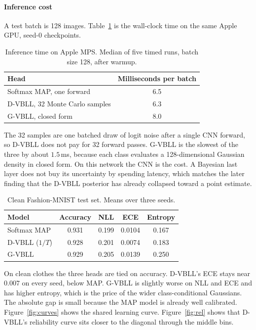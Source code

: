 \documentclass[11pt,a4paper]{article}
\begin{document}
\paragraph{Inference cost}
A test batch is 128 images.
Table~\ref{tab:latency} is the wall-clock time on the same Apple GPU, seed-0 checkpoints.

\begin{table}[H]
\centering
\caption{Inference time on Apple MPS. Median of five timed runs, batch size 128, after warmup.}
\label{tab:latency}
\begin{tabular}{lc}
\toprule
Head & Milliseconds per batch \\
\midrule
Softmax MAP, one forward & 6.5 \\
D-VBLL, 32 Monte Carlo samples & 6.3 \\
G-VBLL, closed form & 8.0 \\
\bottomrule
\end{tabular}
\end{table}

The 32 samples are one batched draw of logit noise after a single CNN forward, so D-VBLL does not pay for 32 forward passes.
G-VBLL is the slowest of the three by about $1.5$\,ms, because each class evaluates a 128-dimensional Gaussian density in closed form.
On this network the CNN is the cost.
A Bayesian last layer does not buy its uncertainty by spending latency, which matches the later finding that the D-VBLL posterior has already collapsed toward a point estimate.

\begin{table}[H]
\centering
\caption{Clean Fashion-MNIST test set. Means over three seeds.}
\label{tab:clean}
\begin{tabular}{lcccc}
\toprule
Model & Accuracy & NLL & ECE & Entropy \\
\midrule
Softmax MAP & 0.931 & 0.199 & 0.0104 & 0.167 \\
D-VBLL ($1/T$) & 0.928 & 0.201 & 0.0074 & 0.183 \\
G-VBLL & 0.929 & 0.205 & 0.0139 & 0.250 \\
\bottomrule
\end{tabular}
\end{table}

On clean clothes the three heads are tied on accuracy.
D-VBLL's ECE stays near $0.007$ on every seed, below MAP.
G-VBLL is slightly worse on NLL and ECE and has higher entropy, which is the price of the wider class-conditional Gaussians.
The absolute gap is small because the MAP model is already well calibrated.
Figure~\ref{fig:curves} shows the shared learning curve.
Figure~\ref{fig:rel} shows that D-VBLL's reliability curve sits closer to the diagonal through the middle bins.
\end{document}

